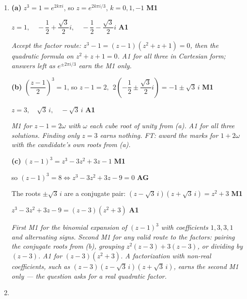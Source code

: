 \documentclass[12pt, twoside]{article}
\begin{document}
\begin{enumerate}[itemsep=0.3cm]
\newpage

\item[3.] [Maximum mark: 7]

\textbf{(a)} $z^{3} = 1 = e^{2k\pi i}$, so $z = e^{2k\pi i/3}$,
$k = 0, 1, -1$ \hfill \textbf{M1}

$z = 1, \quad -\dfrac{1}{2} + \dfrac{\sqrt{3}}{2}i, \quad
-\dfrac{1}{2} - \dfrac{\sqrt{3}}{2}i$ \hfill \textbf{A1}

\emph{Accept the factor route: $z^{3} - 1 = (z - 1)(z^{2} + z + 1) = 0$, then
the quadratic formula on $z^{2} + z + 1 = 0$. A1 for all three in Cartesian
form; answers left as $e^{\pm 2\pi i/3}$ earn the M1 only.}

\textbf{(b)} $\left(\dfrac{z - 1}{2}\right)^{3} = 1$, so
$z - 1 = 2, \ \ 2\left(-\dfrac{1}{2} \pm \dfrac{\sqrt{3}}{2}i\right)
= -1 \pm \sqrt{3}\,i$ \hfill \textbf{M1}

$z = 3, \quad \sqrt{3}\,i, \quad -\sqrt{3}\,i$ \hfill \textbf{A1}

\emph{M1 for $z - 1 = 2\omega$ with $\omega$ each cube root of unity from (a).
A1 for all three solutions. Finding only $z = 3$ earns nothing. FT: award
the marks for $1 + 2\omega$ with the candidate's own roots from (a).}

\textbf{(c)} $(z - 1)^{3} = z^{3} - 3z^{2} + 3z - 1$ \hfill \textbf{M1}

so $(z - 1)^{3} = 8 \iff z^{3} - 3z^{2} + 3z - 9 = 0$ \hfill \textbf{AG}

The roots $\pm\sqrt{3}\,i$ are a conjugate pair:
$(z - \sqrt{3}\,i)(z + \sqrt{3}\,i) = z^{2} + 3$ \hfill \textbf{M1}

$z^{3} - 3z^{2} + 3z - 9 = (z - 3)(z^{2} + 3)$ \hfill \textbf{A1}

\emph{First M1 for the binomial expansion of $(z - 1)^{3}$ with coefficients
$1, 3, 3, 1$ and alternating signs. Second M1 for any valid route to the
factors: pairing the conjugate roots from (b), grouping
$z^{2}(z - 3) + 3(z - 3)$, or dividing by $(z - 3)$. A1 for
$(z - 3)(z^{2} + 3)$. A factorization with non-real coefficients, such as
$(z - 3)(z - \sqrt{3}\,i)(z + \sqrt{3}\,i)$, earns the second M1 only ---
the question asks for a real quadratic factor.}

\newpage

\item[4.] [Maximum mark: 6]


\end{enumerate}
\end{document}
